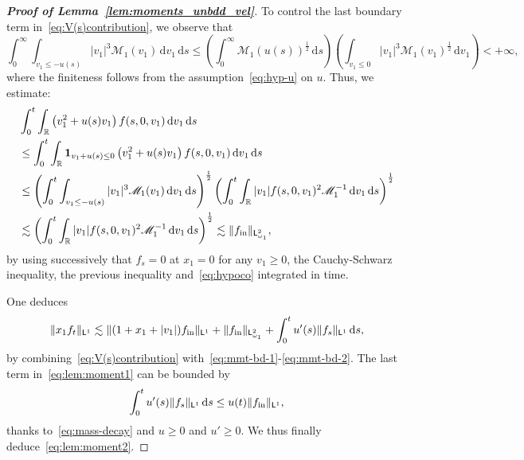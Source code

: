 \documentclass[10pt,a4paper]{amsart}
\def\MMM{{\mathscr M}}
\newcommand\R{{\mathbb R}}
\newcommand{\dd}{{\, \mathrm d}}
\newcommand{\init}{\text{{\tiny {\rm in}}}}
\newcommand{\sfL}{\mathsf{L}}
\begin{document}
\begin{proof}[{\bf Proof of Lemma~\ref{lem:moments_unbdd_vel}}]
  To control the last boundary term in~\eqref{eq:V(s)contribution}, we observe that
  \begin{equation*}
    \int_0^\infty \int_{v_1 \leq -u(s)} |v_1|^3 \MMM_1(v_1)\, \mathrm{d}v_1\, \mathrm{d}s 
    \leq \left( \int_0^\infty \MMM_1(u(s))^{\frac{1}{2}} \, \mathrm{d}s \right) \left( \int_{v_1 \leq 0} |v_1|^3 \MMM_1(v_1)^{\frac{1}{2}} \, \mathrm{d}v_1 \right) < +\infty,
  \end{equation*}
  where the finiteness follows from the assumption~\eqref{eq:hyp-u} on $u$. Thus, we estimate:
  \begin{align}
    \nonumber
    & \int_0^t \int_{\R} \left( v_1^2 + u(s) v_1 \right) f(s,0,v_1) \dd v_1 \dd s \\
    \nonumber
    & \le \int_0^t \int_{\R} {\bf 1}_{v_1+u(s) \le 0} \left( v_1^2 + u(s) v_1 \right) f(s,0,v_1) \dd v_1 \dd s \\ 
    \nonumber
    & \le \left( \int_0^t  \int_{v_1 \le - u(s)} | v_1 |^3 \MMM_1(v_1)\dd v_1 \dd s \right)^{\frac12} \left( \int_0^t \int_{\R} |v_1| f(s,0,v_1)^2 \MMM_1^{-1} \dd v_1 \dd s  \right)^{\frac12} \\
    \label{eq:mmt-bd-2}
    & \lesssim \left( \int_0^t \int_{\R} |v_1| f(s,0,v_1)^2 \MMM_1^{-1} \dd v_1 \dd s \right)^{\frac12} \lesssim \|f_\init\|_{\sfL^{2}_{\omega_1}},
  \end{align}
  by using successively that $f_s =0$ at $x_1=0$ for any $v_1 \ge 0$, the Cauchy-Schwarz inequality, the previous inequality and~\eqref{eq:hypoco} integrated in time. 

  One deduces
  \begin{equation}
    \label{eq:lem:moment1}
    \| x_1 f_t \|_{\sfL^{1}} \lesssim
    \| (1+ x_1 + |v_1|) f_\init \|_{\sfL^{1}} +  \| f_\init \|_{\sfL^{2}_{\omega_1}} + 
    \int_0^t   u'(s) \| f_s \|_{\sfL^{1}} \dd s,
  \end{equation}
  by combining~\eqref{eq:V(s)contribution} with~\eqref{eq:mmt-bd-1}-\eqref{eq:mmt-bd-2}. The last term in~\eqref{eq:lem:moment1} can be bounded by
  \begin{equation*}
    \int_0^t   u'(s) \| f_s \|_{\sfL^1} \dd s \le u(t) \| f_\init \|_{\sfL^1},
  \end{equation*}
  thanks to~\eqref{eq:mass-decay} and \( u \ge 0 \) and \( u' \ge 0 \). We thus finally deduce~\eqref{eq:lem:moment2}.
\end{proof}
\end{document}

